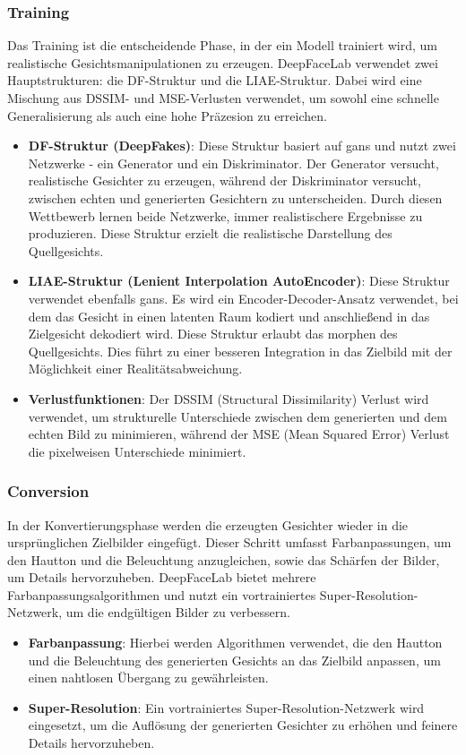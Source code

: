 \subsubsection*{Training}
Das Training ist die entscheidende Phase, in der ein Modell trainiert wird, um realistische Gesichtsmanipulationen zu erzeugen.
DeepFaceLab verwendet zwei Hauptstrukturen: die DF-Struktur und die LIAE-Struktur.
Dabei wird eine Mischung aus DSSIM- und MSE-Verlusten verwendet, um sowohl eine schnelle Generalisierung als auch eine hohe Präzesion zu erreichen\cite{deepfacelabintegratedflexibleextensible, deepfacelab}.

\begin{itemize}
    \item \textbf{DF-Struktur (DeepFakes)}: Diese Struktur basiert auf \glspl{gan} und nutzt zwei Netzwerke - ein Generator und ein Diskriminator. 
    Der Generator versucht, realistische Gesichter zu erzeugen, während der Diskriminator versucht, zwischen echten und generierten Gesichtern zu unterscheiden.
    Durch diesen Wettbewerb lernen beide Netzwerke, immer realistischere Ergebnisse zu produzieren.
    Diese Struktur erzielt die realistische Darstellung des Quellgesichts.
    \item \textbf{LIAE-Struktur (Lenient Interpolation AutoEncoder)}: Diese Struktur verwendet ebenfalls \glspl{gan}.
     Es wird ein Encoder-Decoder-Ansatz verwendet, bei dem das Gesicht in einen latenten Raum kodiert und anschließend in das Zielgesicht dekodiert wird.
     Diese Struktur erlaubt das morphen des Quellgesichts. Dies führt zu einer besseren Integration in das Zielbild mit der Möglichkeit einer Realitätsabweichung.
    \item \textbf{Verlustfunktionen}: Der DSSIM (Structural Dissimilarity) Verlust wird verwendet, um strukturelle Unterschiede zwischen dem generierten und dem echten Bild zu minimieren, während der MSE (Mean Squared Error) Verlust die pixelweisen Unterschiede minimiert.
\end{itemize}

\subsubsection*{Conversion}
In der Konvertierungsphase werden die erzeugten Gesichter wieder in die ursprünglichen Zielbilder eingefügt.
Dieser Schritt umfasst Farbanpassungen, um den Hautton und die Beleuchtung anzugleichen, sowie das Schärfen der Bilder, um Details hervorzuheben.
DeepFaceLab bietet mehrere Farbanpassungsalgorithmen und nutzt ein vortrainiertes Super-Resolution-Netzwerk, um die endgültigen Bilder zu verbessern\cite{deepfacelabintegratedflexibleextensible, deepfacelab}.

\begin{itemize}
    \item \textbf{Farbanpassung}: Hierbei werden Algorithmen verwendet, die den Hautton und die Beleuchtung des generierten Gesichts an das Zielbild anpassen, um einen nahtlosen Übergang zu gewährleisten.
    \item \textbf{Super-Resolution}: Ein vortrainiertes Super-Resolution-Netzwerk wird eingesetzt, um die Auflösung der generierten Gesichter zu erhöhen und feinere Details hervorzuheben.
\end{itemize}
